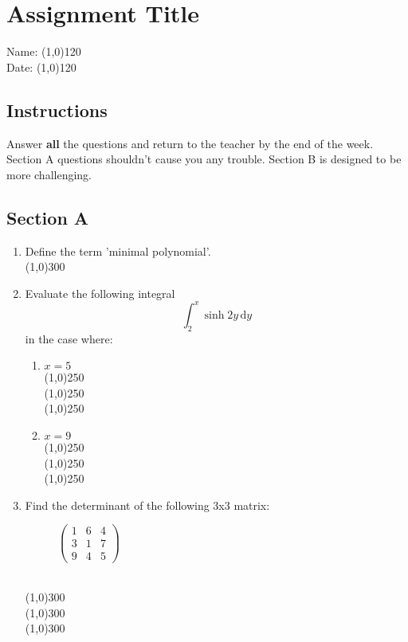 \documentclass{article}
\begin{document}
\section*{Assignment Title}
Name: \line(1,0){120} %
\\Date: \line(1,0){120}

\subsection*{Instructions} %
Answer {\bf all} the questions and return to the teacher by the end of the week. Section A questions shouldn't cause you any trouble. Section B is designed to be more challenging.

\subsection*{Section A}

\begin{enumerate}%

\item Define the term 'minimal polynomial'.
\\\line(1,0){300}

\item Evaluate the following integral 
\begin{equation*}
\int_{2}^{x} \sinh{2y}\, \mathrm{d}y
\end{equation*}
in the case where:
    \begin{enumerate}
    \item $x = 5$
    \\\line(1,0){250}
    \\\line(1,0){250}
    \\\line(1,0){250}
    \item $x = 9$
    \\\line(1,0){250}
    \\\line(1,0){250}
    \\\line(1,0){250}
    \end{enumerate}
    
\item Find the determinant of the following 3x3 matrix:
\begin{figure}[h!]%
\centering
\begin{math}
\begin{pmatrix}
1 & 6 & 4 \\
3 & 1 & 7 \\
9 & 4 & 5
\end{pmatrix}
\end{math}
\end{figure}
\\\line(1,0){300}
\\\line(1,0){300}
\\\line(1,0){300}

\end{enumerate}%
\end{document}
